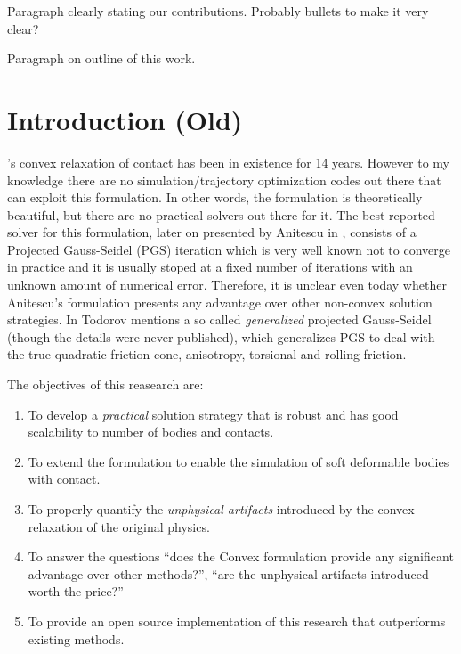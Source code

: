 
Paragraph clearly stating our contributions. Probably bullets to make it very
clear?

Paragraph on outline of this work.


\section{Introduction (Old)}

's convex relaxation of contact
\cite{bib:anitescu2006} has been in existence for 14 years. However to my
knowledge there are no simulation/trajectory optimization codes out there that
can exploit this formulation. In other words, the formulation is theoretically
beautiful, but there are no practical solvers out there for it. The best
reported solver for this formulation, later on presented by Anitescu in
\cite{bib:anitescu2010, bib:tasora2011}, consists of a Projected Gauss-Seidel
(PGS) iteration which is very well known not to converge in practice and it is
usually stoped at a fixed number of iterations with an unknown amount of
numerical error. Therefore, it is unclear even today whether Anitescu's
formulation presents any advantage over other non-convex solution strategies. In
\cite{bib:todorov2014} Todorov mentions a so called \textit{generalized}
projected Gauss-Seidel (though the details were never published), which
generalizes PGS to deal with the true quadratic friction cone, anisotropy,
torsional and rolling friction.

The objectives of this reasearch are:
\begin{enumerate}
	\item To develop a \textit{practical} solution strategy that is robust and
	has good scalability to number of bodies and contacts.
	\item To extend the formulation to enable the simulation of soft deformable
	bodies with contact.
	\item To properly quantify the \textit{unphysical artifacts} introduced by
	the convex relaxation of the original physics.
	\item To answer the questions ``does the Convex formulation provide any
	significant advantage over other methods?'', ``are the unphysical artifacts
	introduced worth the price?''
	\item To provide an open source implementation of this research that
	outperforms existing methods.
\end{enumerate}

